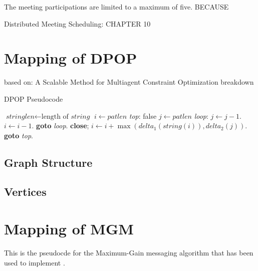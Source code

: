 The meeting participations are limited to a maximum of five. BECAUSE

Distributed Meeting Scheduling: CHAPTER 10

\section{Mapping of DPOP}

based on: A Scalable Method for Multiagent Constraint Optimization
breakdown
   

\begin{algorithm}
\caption{DPOP Pseudocode}\label{euclid}
\begin{algorithmic}[1]
\State $\textit{stringlen} \gets \text{length of }\textit{string}$
\State $i \gets \textit{patlen}$
\BState \emph{top}:
 \Return false
\EndIf
\State $j \gets \textit{patlen}$
\BState \emph{loop}:
\State $j \gets j-1$.
\State $i \gets i-1$.
\State \textbf{goto} \emph{loop}.
\State \textbf{close};
\EndIf
\State $i \gets i+\max(\textit{delta}_1(\textit{string}(i)),\textit{delta}_2(j))$.
\State \textbf{goto} \emph{top}.
\EndProcedure
\end{algorithmic}
\end{algorithm}

\subsection{Graph Structure}


\subsection{Vertices}


\section{Mapping of MGM}

This is the pseudocde for the Maximum-Gain messaging algorithm that has been used to implement \cite{Chapman2011}.


